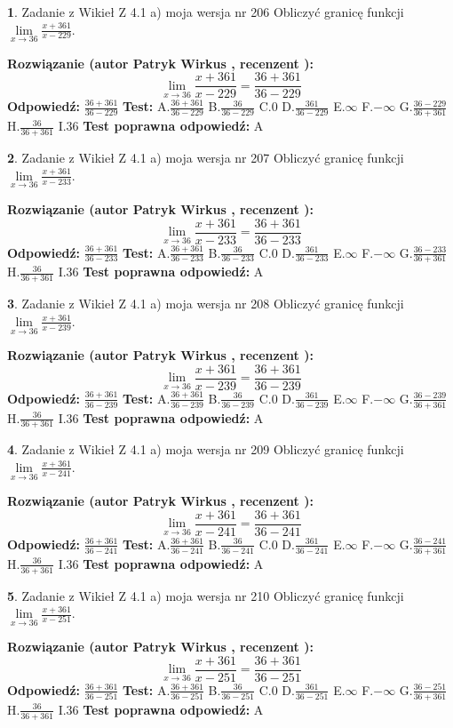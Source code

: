 \documentclass[12pt, a4paper]{article}
\theoremstyle{definition} %
\newtheorem{zad}{}
\newcommand{\zadStart}[1]{\begin{zad}#1\newline}
\newcommand{\zadStop}{\end{zad}}
\newcommand{\rozwStart}[2]{\noindent \textbf{Rozwiązanie (autor #1 , recenzent #2): }\newline}
\newcommand{\rozwStop}{\newline}
\newcommand{\odpStart}{\noindent \textbf{Odpowiedź:}\newline}
\newcommand{\odpStop}{\newline}
\newcommand{\testStart}{\noindent \textbf{Test:}\newline}
\newcommand{\testStop}{\newline}
\newcommand{\kluczStart}{\noindent \textbf{Test poprawna odpowiedź:}\newline}
\newcommand{\kluczStop}{\newline}
\begin{document}
\zadStart{Zadanie z Wikieł Z 4.1 a) moja wersja nr 206}
Obliczyć granicę funkcji $\lim\limits_{x\to36}\frac{x+361}{x-229}$.
\zadStop
\rozwStart{Patryk Wirkus}{}
$$\lim\limits_{x\to36}\frac{x+361}{x-229} = \frac{36+361}{36-229}$$
\rozwStop
\odpStart
$\frac{36+361}{36-229}$
\odpStop
\testStart
A.$\frac{36+361}{36-229}$
B.$\frac{36}{36-229}$
C.$0$
D.$\frac{361}{36-229}$
E.$\infty$
F.$-\infty$
G.$\frac{36-229}{36+361}$
H.$\frac{36}{36+361}$
I.$36$
\testStop
\kluczStart
A
\kluczStop



\zadStart{Zadanie z Wikieł Z 4.1 a) moja wersja nr 207}
Obliczyć granicę funkcji $\lim\limits_{x\to36}\frac{x+361}{x-233}$.
\zadStop
\rozwStart{Patryk Wirkus}{}
$$\lim\limits_{x\to36}\frac{x+361}{x-233} = \frac{36+361}{36-233}$$
\rozwStop
\odpStart
$\frac{36+361}{36-233}$
\odpStop
\testStart
A.$\frac{36+361}{36-233}$
B.$\frac{36}{36-233}$
C.$0$
D.$\frac{361}{36-233}$
E.$\infty$
F.$-\infty$
G.$\frac{36-233}{36+361}$
H.$\frac{36}{36+361}$
I.$36$
\testStop
\kluczStart
A
\kluczStop



\zadStart{Zadanie z Wikieł Z 4.1 a) moja wersja nr 208}
Obliczyć granicę funkcji $\lim\limits_{x\to36}\frac{x+361}{x-239}$.
\zadStop
\rozwStart{Patryk Wirkus}{}
$$\lim\limits_{x\to36}\frac{x+361}{x-239} = \frac{36+361}{36-239}$$
\rozwStop
\odpStart
$\frac{36+361}{36-239}$
\odpStop
\testStart
A.$\frac{36+361}{36-239}$
B.$\frac{36}{36-239}$
C.$0$
D.$\frac{361}{36-239}$
E.$\infty$
F.$-\infty$
G.$\frac{36-239}{36+361}$
H.$\frac{36}{36+361}$
I.$36$
\testStop
\kluczStart
A
\kluczStop



\zadStart{Zadanie z Wikieł Z 4.1 a) moja wersja nr 209}
Obliczyć granicę funkcji $\lim\limits_{x\to36}\frac{x+361}{x-241}$.
\zadStop
\rozwStart{Patryk Wirkus}{}
$$\lim\limits_{x\to36}\frac{x+361}{x-241} = \frac{36+361}{36-241}$$
\rozwStop
\odpStart
$\frac{36+361}{36-241}$
\odpStop
\testStart
A.$\frac{36+361}{36-241}$
B.$\frac{36}{36-241}$
C.$0$
D.$\frac{361}{36-241}$
E.$\infty$
F.$-\infty$
G.$\frac{36-241}{36+361}$
H.$\frac{36}{36+361}$
I.$36$
\testStop
\kluczStart
A
\kluczStop



\zadStart{Zadanie z Wikieł Z 4.1 a) moja wersja nr 210}
Obliczyć granicę funkcji $\lim\limits_{x\to36}\frac{x+361}{x-251}$.
\zadStop
\rozwStart{Patryk Wirkus}{}
$$\lim\limits_{x\to36}\frac{x+361}{x-251} = \frac{36+361}{36-251}$$
\rozwStop
\odpStart
$\frac{36+361}{36-251}$
\odpStop
\testStart
A.$\frac{36+361}{36-251}$
B.$\frac{36}{36-251}$
C.$0$
D.$\frac{361}{36-251}$
E.$\infty$
F.$-\infty$
G.$\frac{36-251}{36+361}$
H.$\frac{36}{36+361}$
I.$36$
\testStop
\kluczStart
A
\kluczStop
\end{document}
